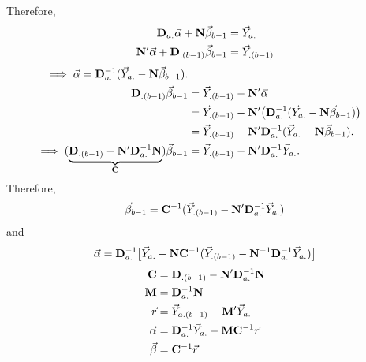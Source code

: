 Therefore,
\begin{align*}
    \mathbf{D}_{a.}\vec{\alpha}+\mathbf{N}\vec{\beta}_{b-1}      & =\vec{Y}_{a.}     \\
    \mathbf{N}'\vec{\alpha}+\mathbf{D}_{.(b-1)}\vec{\beta}_{b-1} & =\vec{Y}_{.(b-1)}
\end{align*}
\begin{align*}
    \implies \vec{\alpha}=\mathbf{D}_{a.}^{-1}(\vec{Y}_{a.}-\mathbf{N}\vec{\beta}_{b-1}).                                                                                                                                            \\
    \mathbf{D}_{.(b-1)}\vec{\beta}_{b-1}                                                                                & =\vec{Y}_{.(b-1)}-\mathbf{N}'\vec{\alpha}                                                                  \\
                                                                                                                           & =\vec{Y}_{.(b-1)}-\mathbf{N}'\bigl(\mathbf{D}_{a.}^{-1}(\vec{Y}_{a.}-\mathbf{N}\vec{\beta}_{b-1})\bigr) \\
                                                                                                                           & =\vec{Y}_{.(b-1)}-\mathbf{N}'\mathbf{D}_{a.}^{-1}(\vec{Y}_{a.}-\mathbf{N}\vec{\beta}_{b-1}).            \\
    \implies (\underbrace{\mathbf{D}_{.(b-1)}-\mathbf{N}'\mathbf{D}_{a.}^{-1}\mathbf{N}}_{\mathbf{C}})\vec{\beta}_{b-1} & =\vec{Y}_{.(b-1)}-\mathbf{N}'\mathbf{D}_{a.}^{-1}\vec{Y}_{a.}.
\end{align*}
Therefore,
\[ \vec{\beta}_{b-1}=\mathbf{C}^{-1}(\vec{Y}_{.(b-1)}-\mathbf{N}'\mathbf{D}_{a.}^{-1}\vec{Y}_{a.}) \]
and
\[ \vec{\alpha}=\mathbf{D}_{a.}^{-1}\bigl[\vec{Y}_{a.}-\mathbf{N}\mathbf{C}^{-1}(\vec{Y}_{.(b-1)}-\mathbf{N}^{-1}\mathbf{D}_{a.}^{-1}\vec{Y}_{a.})\bigr] \]
\begin{align*}
    \mathbf{C}      & =\mathbf{D}_{.(b-1)}-\mathbf{N}'\mathbf{D}_{a.}^{-1}\mathbf{N}           \\
    \mathbf{M}      & =\mathbf{D}_{a.}^{-1}\mathbf{N}                                          \\
    \vec{r}      & =\vec{Y}_{a.(b-1)}-\mathbf{M}'\vec{Y}_{a.}                         \\
    \vec{\alpha} & =\mathbf{D}_{a.}^{-1}\vec{Y}_{a.}-\mathbf{M}\mathbf{C}^{-1}\vec{r} \\
    \vec{\beta}  & =\mathbf{C}^{-1}\vec{r}
\end{align*}
